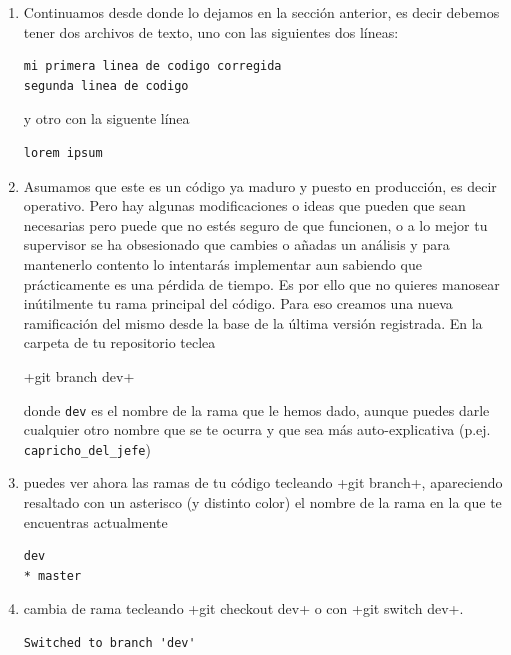 \documentclass[a4paper,10pt]{article}
\begin{document}
    \begin{enumerate}
     \item Continuamos desde donde lo dejamos en la sección anterior, es decir debemos tener dos archivos de texto, uno con las siguientes dos líneas:
     \begin{lstlisting}[style=custom]
mi primera linea de codigo corregida
segunda linea de codigo
     \end{lstlisting}
     
     y otro con la siguente línea
     
    \begin{lstlisting}[style=custom]
lorem ipsum
    \end{lstlisting}
    
    \item Asumamos que este es un código ya maduro y puesto en producción, es decir operativo. Pero hay algunas modificaciones o ideas que pueden que sean necesarias pero puede que no estés seguro de que funcionen, o a lo mejor tu supervisor se ha obsesionado que cambies o añadas un análisis y para mantenerlo contento lo intentarás implementar aun sabiendo que prácticamente es una pérdida de tiempo. Es por ello que no quieres manosear inútilmente tu rama principal del código. Para eso creamos una nueva ramificación del mismo desde la base de la última versión registrada. En la carpeta de tu repositorio teclea
    
    \cverb+git branch dev+
    
    donde \verb+dev+ es el nombre de la rama que le hemos dado, aunque puedes darle cualquier otro nombre que se te ocurra y que sea más auto-explicativa (p.ej. \verb+capricho_del_jefe+)
    
    \item puedes ver ahora las ramas de tu código tecleando \cverb+git branch+, apareciendo resaltado con un asterisco (y distinto color) el nombre de la rama en la que te encuentras actualmente
    
    \begin{lstlisting}[style=custom]
  dev
* master
    \end{lstlisting}

    \item cambia de rama tecleando \cverb+git checkout dev+ o con \cverb+git switch dev+.
    
    \begin{lstlisting}[style=custom]
Switched to branch 'dev'
    \end{lstlisting}
    

\end{enumerate}
\end{document}
